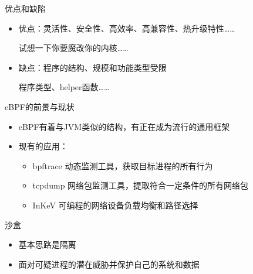 \documentclass[UTF8,fontset=macnew,xcolor=table]{ctexbeamer}
\begin{document}
\begin{frame}{优点和缺陷}

    \begin{itemize}
        \item 优点：灵活性、安全性、高效率、高兼容性、热升级特性……
        
        试想一下你要魔改你的内核……
    
        \item 缺点：程序的结构、规模和功能类型受限
        
        程序类型、helper函数……
    \end{itemize}
    
\end{frame}

\begin{frame}{eBPF的前景与现状}
    \begin{itemize}
        \item eBPF有着与JVM类似的结构，有正在成为流行的通用框架

        \item 现有的应用：
        \begin{itemize}
            \item bpftrace	动态监测工具，获取目标进程的所有行为
            \item tcpdump	网络包监测工具，提取符合一定条件的所有网络包
            \item InKeV	可编程的网络设备负载均衡和路径选择
        \end{itemize}
    \end{itemize}
\end{frame}

\begin{frame}{沙盒}
    \begin{itemize}
        \item 基本思路是隔离

        \item 面对可疑进程的潜在威胁并保护自己的系统和数据
    \end{itemize}
\end{frame}
\end{document}
